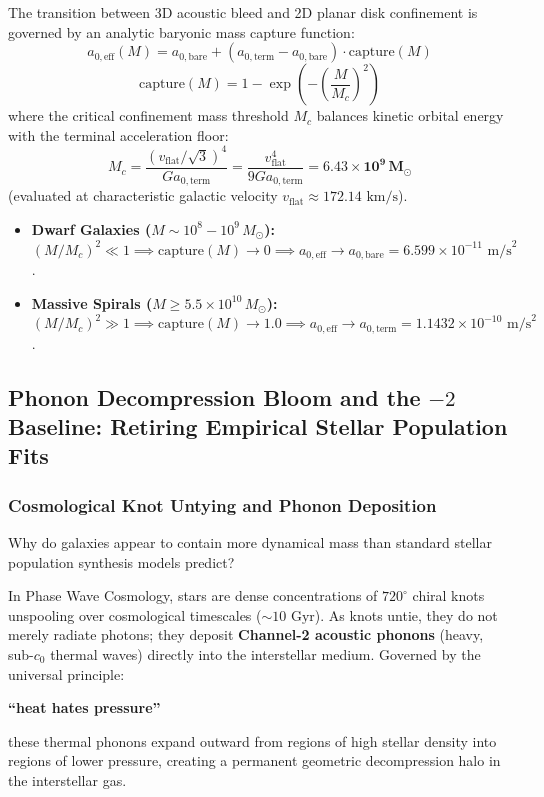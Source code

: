 \documentclass[11pt,a4paper]{article}
\begin{document}
The transition between 3D acoustic bleed and 2D planar disk confinement is governed by an analytic baryonic mass capture function:
\begin{equation}
a_{0,\text{eff}}(M) = a_{0,\text{bare}} + (a_{0,\text{term}} - a_{0,\text{bare}}) \cdot \text{capture}(M)
\label{eq:a0_eff_def}
\end{equation}
\begin{equation}
\text{capture}(M) = 1 - \exp\left(-\left(\frac{M}{M_c}\right)^2\right)
\label{eq:capture_def}
\end{equation}
where the critical confinement mass threshold $M_c$ balances kinetic orbital energy with the terminal acceleration floor:
\begin{equation}
M_c = \frac{(v_{\text{flat}}/\sqrt{3})^4}{G a_{0,\text{term}}} = \frac{v_{\text{flat}}^4}{9 G a_{0,\text{term}}} = \mathbf{6.43 \times 10^9\,M_\odot}
\label{eq:mc_transition_mass}
\end{equation}
(evaluated at characteristic galactic velocity $v_{\text{flat}} \approx 172.14\text{ km/s}$).

\begin{itemize}
    \item \textbf{Dwarf Galaxies ($M \sim 10^8 - 10^9\,M_\odot$):} $(M/M_c)^2 \ll 1 \implies \text{capture}(M) \to 0 \implies a_{0,\text{eff}} \to a_{0,\text{bare}} = 6.599 \times 10^{-11}\text{ m/s}^2$.
    \item \textbf{Massive Spirals ($M \ge 5.5 \times 10^{10}\,M_\odot$):} $(M/M_c)^2 \gg 1 \implies \text{capture}(M) \to 1.0 \implies a_{0,\text{eff}} \to a_{0,\text{term}} = 1.1432 \times 10^{-10}\text{ m/s}^2$.
\end{itemize}

\subsection{Phonon Decompression Bloom and the $-2$ Baseline: Retiring Empirical Stellar Population Fits}
\label{subsec:phonon_bloom}

\subsubsection{Cosmological Knot Untying and Phonon Deposition}
\label{subsubsec:knot_untying}

Why do galaxies appear to contain more dynamical mass than standard stellar population synthesis models predict?

In Phase Wave Cosmology, stars are dense concentrations of $720^\circ$ chiral knots unspooling over cosmological timescales ($\sim 10\text{ Gyr}$). As knots untie, they do not merely radiate photons; they deposit \textbf{Channel-2 acoustic phonons} (heavy, sub-$c_0$ thermal waves) directly into the interstellar medium. Governed by the universal principle:
\begin{center}
\textbf{``heat hates pressure''}
\end{center}
these thermal phonons expand outward from regions of high stellar density into regions of lower pressure, creating a permanent geometric decompression halo in the interstellar gas.
\end{document}
